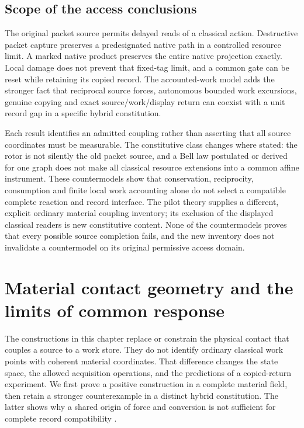 \documentclass[11pt,oneside,openany]{book}
\theoremstyle{definition}
\theoremstyle{remark}\newtheorem{remark}[theorem]{Remark}
\begin{document}
\section{Scope of the access conclusions}
The original packet source permits delayed reads of a classical action.
Destructive packet capture preserves a predesignated native path in a
controlled resource limit. A marked native product preserves the entire
native projection exactly. Local damage does not prevent that fixed-tag
limit, and a common gate can be reset while retaining its copied record.
The accounted-work model adds the stronger fact that reciprocal source
forces, autonomous bounded work excursions, genuine copying and exact
source/work/display return can coexist with a unit record gap in a
specific hybrid constitution.

Each result identifies an admitted coupling rather than asserting that
all source coordinates must be measurable. The constitutive class changes
where stated: the rotor is not silently the old packet source, and a
Bell law postulated or derived for one graph does not make all classical
resource extensions into a common affine instrument. These countermodels
show that conservation, reciprocity, consumption and finite local work
accounting alone do not select a compatible complete reaction and record
interface. The pilot theory supplies a different, explicit ordinary
material coupling inventory; its exclusion of the displayed classical
readers is new constitutive content. None of the countermodels proves that
every possible source completion fails, and the new inventory does not
invalidate a countermodel on its original permissive access domain.



\chapter[Material contact geometry and response]{Material contact geometry and the limits of common response}
\label{mat:geometry}

The constructions in this chapter replace or constrain the physical contact that couples a source to a work store. They do not identify ordinary classical work points with coherent material coordinates. That difference changes the state space, the allowed acquisition operations, and the predictions of a copied-return experiment. We first prove a positive construction in a complete material field, then retain a stronger counterexample in a distinct hybrid constitution. The latter shows why a shared origin of force and conversion is not sufficient for complete record compatibility \cite{M26,M28}.
\end{document}
